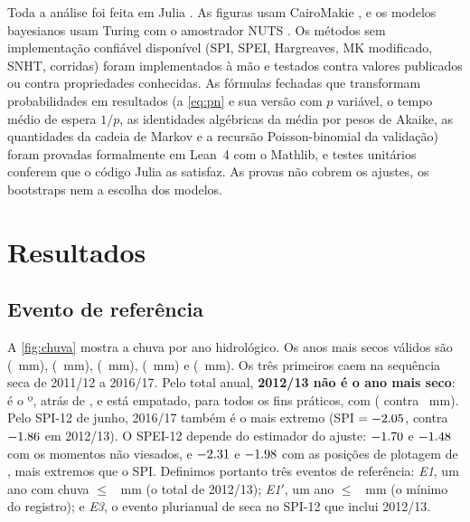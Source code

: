 \documentclass[11pt,a4paper]{article}
\begin{document}
Toda a análise foi feita em Julia \parencite{bezanson2017}. As figuras usam CairoMakie
\parencite{danisch2021}, e os modelos bayesianos usam Turing \parencite{ge2018} com o amostrador
NUTS \parencite{hoffman2014}. Os métodos sem implementação confiável disponível (SPI, SPEI,
Hargreaves, MK modificado, SNHT, corridas) foram implementados à mão e testados contra valores
publicados \parencite{allen1998} ou contra propriedades conhecidas. As fórmulas fechadas que
transformam probabilidades em resultados (a \cref{eq:pn} e sua versão com $p$ variável, o tempo
médio de espera $1/p$, as identidades algébricas da média por pesos de Akaike, as quantidades da
cadeia de Markov e a recursão Poisson-binomial da validação) foram provadas formalmente em Lean~4 com o Mathlib, e
testes unitários conferem que o código Julia as satisfaz. As provas não cobrem os ajustes, os
bootstraps nem a escolha dos modelos.

\section{Resultados}\label{sec:resultados}

\subsection{Evento de referência}
A \cref{fig:chuva} mostra a chuva por ano hidrológico. Os anos mais secos válidos são
\RankAnoum{} (\RankChuvaum{}~mm), \RankAnodois{} (\RankChuvadois{}~mm), \RankAnotres{}
(\RankChuvatres{}~mm), \RankAnoquatro{} (\RankChuvaquatro{}~mm) e \RankAnocinco{}
(\RankChuvacinco{}~mm). Os três primeiros caem na sequência seca de 2011/12 a 2016/17. Pelo
total anual, \textbf{2012/13 não é o ano mais seco}: é o \RankDozeTreze{}º, atrás de
\AnoMinimo{}, e está empatado, para todos os fins práticos, com \RankAnotres{}
(\RankChuvadois{} contra \RankChuvatres{}~mm). Pelo SPI-12
de junho, 2016/17 também é o mais extremo (SPI $=\num{-2.05}$, contra
$\num{-1.86}$ em 2012/13). O SPEI-12 depende do estimador do ajuste: $\num{-1.70}$ e
$\num{-1.48}$ com os momentos não viesados, e $\num{-2.31}$ e $\num{-1.98}$ com as
posições de plotagem de \textcite{vicenteserrano2010}, mais extremos que o SPI. Definimos
portanto três eventos de referência: \emph{E1}, um ano com chuva $\le$ \ChuvaDozeTreze{}~mm (o
total de 2012/13); \emph{E1$'$}, um ano $\le$ \ChuvaMinima{}~mm (o mínimo do registro); e
\emph{E3}, o evento plurianual de seca no SPI-12 que inclui 2012/13.
\end{document}
